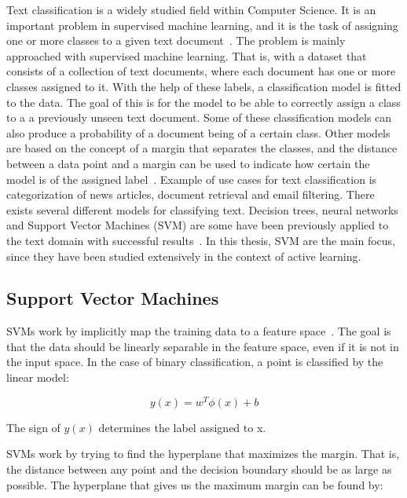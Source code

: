 Text classification is a widely studied field within Computer Science.
It is an important problem in supervised machine learning, and it is the task of assigning one or more classes to a given text document~\cite{aggarwal2012surveyclass}.
The problem is mainly approached with supervised machine learning.
That is, with a dataset that consists of a collection of text documents, where each document has one or more classes assigned to it. %
With the help of these labels, a classification model is fitted to the data.
The goal of this is for the model to be able to correctly assign a class to a a previously unseen text document.
Some of these classification models can also produce a probability of a document being of a certain class.
Other models are based on the concept of a margin that separates the classes, and the distance between a data point and a margin can be used to indicate how certain the model is of the assigned label~\cite{tong2001support}.
Example of use cases for text classification is categorization of news articles, document retrieval and email filtering.
There exists several different models for classifying text.
Decision trees, neural networks and Support Vector Machines (SVM) are some have been previously applied to the text domain with successful results~\cite{aggarwal2012survey}.
In this thesis, SVM are the main focus, since they have been studied extensively in the context of active learning. %

\subsection{Support Vector Machines}

SVMs work by implicitly map the training data to a feature space~\cite{bishop2006pattern}.
The goal is that the data should be linearly separable in the feature space, even if it is not in the input space.
In the case of binary classification, a point is classified by the linear model:

\begin{equation}
    y(x) = w^T \phi(x) + b
\end{equation}

The sign of $y(x)$ determines the label assigned to x.

SVMs work by trying to find the hyperplane that maximizes the margin.
That is, the distance between any point and the decision boundary should be as large as possible.
The hyperplane that gives us the maximum margin can be found by:


